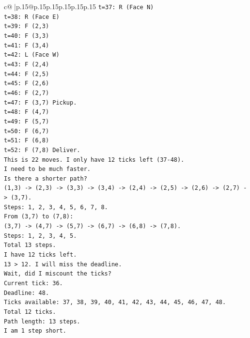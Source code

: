 \documentclass{article}
\begin{document}
{\begin{supertabular}{c@{$\;$}|p{.15\linewidth}@{}p{.15\linewidth}p{.15\linewidth}p{.15\linewidth}p{.15\linewidth}p{.15\linewidth}}
{{{\texttt{t=37: R (Face N)} \\
\texttt{t=38: R (Face E)} \\
\texttt{t=39: F (2,3)} \\
\texttt{t=40: F (3,3)} \\
\texttt{t=41: F (3,4)} \\
\texttt{t=42: L (Face W)} \\
\texttt{t=43: F (2,4)} \\
\texttt{t=44: F (2,5)} \\
\texttt{t=45: F (2,6)} \\
\texttt{t=46: F (2,7)} \\
\texttt{t=47: F (3,7) Pickup.} \\
\texttt{t=48: F (4,7)} \\
\texttt{t=49: F (5,7)} \\
\texttt{t=50: F (6,7)} \\
\texttt{t=51: F (6,8)} \\
\texttt{t=52: F (7,8) Deliver.} \\
\texttt{This is 22 moves. I only have 12 ticks left (37{-}48).} \\
\texttt{I need to be much faster.} \\
\texttt{Is there a shorter path?} \\
\texttt{(1,3) {-}> (2,3) {-}> (3,3) {-}> (3,4) {-}> (2,4) {-}> (2,5) {-}> (2,6) {-}> (2,7) {-}> (3,7).} \\
\texttt{Steps: 1, 2, 3, 4, 5, 6, 7, 8.} \\
\texttt{From (3,7) to (7,8):} \\
\texttt{(3,7) {-}> (4,7) {-}> (5,7) {-}> (6,7) {-}> (6,8) {-}> (7,8).} \\
\texttt{Steps: 1, 2, 3, 4, 5.} \\
\texttt{Total 13 steps.} \\
\texttt{I have 12 ticks left.} \\
\texttt{13 > 12. I will miss the deadline.} \\
\texttt{Wait, did I miscount the ticks?} \\
\texttt{Current tick: 36.} \\
\texttt{Deadline: 48.} \\
\texttt{Ticks available: 37, 38, 39, 40, 41, 42, 43, 44, 45, 46, 47, 48.} \\
\texttt{Total 12 ticks.} \\
\texttt{Path length: 13 steps.} \\
\texttt{I am 1 step short.} \\
}}}
\end{supertabular}}
\end{document}
